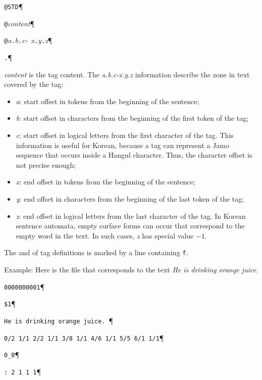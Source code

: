 \bigskip
\noindent \verb$@STD$\P

\noindent \verb$@$\textit{content}\P

\noindent \verb$@$\textit{a}\verb$.$\textit{b}\verb$.$\textit{c}\verb$-$
\textit{x}\verb$.$\textit{y}\verb$.$\textit{z}\P

\noindent \verb$.$\P


\bigskip
\noindent \textit{content} is the tag content. The \textit{a.b.c-x.y.z}
information describe the zone in text covered by the tag:

\begin{itemize}
    \item \textit{a}: start offset in tokens from the beginning of the sentence;
    \item \textit{b}: start offset in characters from the beginning of the
    first token of the tag;
    \item \textit{c}: start offset in logical letters from the first character
    of the tag. This information is useful for Korean, because a tag can
    represent a Jamo sequence that occurs inside a Hangul character. Thus, the 
    character offset is not precise enough;
    \item \textit{x}: end offset in tokens from the beginning of the sentence;
    \item \textit{y}: end offset in characters from the beginning of the
    last token of the tag;
    \item \textit{z}: end offset in logical letters from the last character of
    the tag. In Korean sentence automata, empty surface forms can occur that
    correspond to the empty word in the text. In such cases, \textit{z} has
    special value $-1$.
\end{itemize}

\bigskip
\noindent The and of tag definitions is marked by a line containing \verb+f+.

\bigskip
\noindent Example: Here is the file that corresponds to the text \textit{He is
drinking orange juice.}

\bigskip
\noindent\verb$0000000001$\P

\noindent\verb+$1+\P

\noindent\verb$He is drinking orange juice. $\P

\noindent\verb$0/2 1/1 2/2 1/1 3/8 1/1 4/6 1/1 5/5 6/1 1/1$\P

\noindent\verb$0_0$\P

\noindent\verb$: 2 1 1 1$\P

